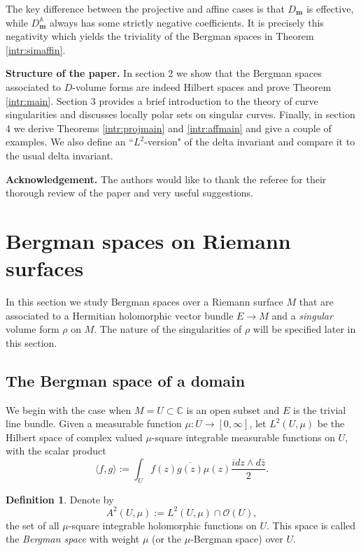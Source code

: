 \documentclass[11pt]{amsart}
\theoremstyle{definition}
\newtheorem{definition}[theorem]{Definition}
\newcommand{\bC}{{\mathbb C}}
\begin{document}
\noindent The key difference between the projective and affine cases is that $D_\mathbf{m}$ is effective, while $D_\mathbf{m}^\mathbb{A}$ always has some strictly negative coefficients. It is precisely this negativity which yields the triviality of the Bergman spaces in Theorem \ref{intr:simaffin}.\vspace{3mm}

\noindent \textbf{Structure of the paper.} In section 2 we show that the Bergman spaces associated to $D$-volume forms are indeed Hilbert spaces and prove Theorem \ref{intr:main}. Section 3 provides a brief introduction to the theory of curve singularities and discusses locally polar sets on singular curves. Finally, in section 4 we derive Theorems \ref{intr:projmain} and \ref{intr:affmain} and give a couple of examples. We also define an ``$L^2$-version" of the delta invariant and compare it to the usual delta invariant.\vspace{3mm}

\noindent \textbf{Acknowledgement.} The authors would like to thank the referee for their thorough review of the paper and very useful suggestions.


\section{Bergman spaces on Riemann surfaces}

\noindent In this section we study Bergman spaces over a Riemann surface $M$ that
 are associated to a 
 Hermitian holomorphic vector bundle $E\rightarrow M$ and a \emph{singular} volume form $\rho$ on 
 $M$. The nature of the singularities of $\rho$ will be specified later in this section.

\subsection{The Bergman space of a domain}
 \noindent We begin with the case when $M=U\subset\bC$ is an open subset and $E$ is the trivial line bundle.
Given a measurable function $\mu:U\rightarrow[0,\infty]$, let $L^2(U,\mu)$ be the Hilbert space of complex valued $\mu$-square integrable measurable functions on $U$, with the scalar product
$$
\langle f, g\rangle:=\int_U f(z)\overline{g(z)}\mu(z)\frac{idz\wedge d\bar{z}}{2}.
$$ 
  \begin{definition} 
  Denote by 
  $$A^2(U,\mu):=L^2(U,\mu)\cap\mathcal O(U),
  $$ the set of all $\mu$-square integrable holomorphic functions on $U$.  This space 
  is called the \emph{Bergman space} with weight $\mu$ (or the $\mu$-Bergman space) over $U$.
  \end{definition}
  
\end{document}
